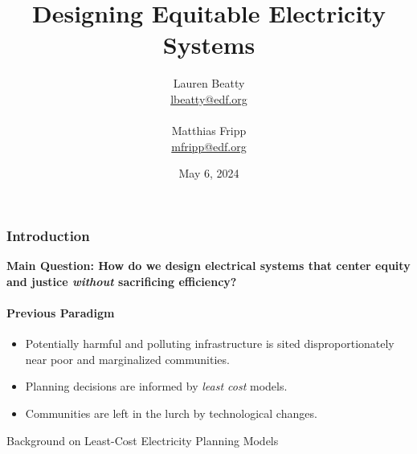 \documentclass{beamer}
\title{Designing Equitable Electricity Systems}
\author{Lauren Beatty\\ \href{mailto:lbeatty@edf.org}{lbeatty@edf.org}\\
\vspace{.5cm}\\
Matthias Fripp\\
\href{mailto:mfripp@edf.org}{mfripp@edf.org}}
\institute{Environmental Defense Fund}
\date{May 6, 2024}
\begin{document}
\frame{\titlepage}

\begin{frame}
\frametitle{Introduction}
\textbf{Main Question:  How do we design electrical systems that center equity and justice \textit{without} sacrificing efficiency?}
\vspace{1cm}

\paragraph{\textbf{Previous Paradigm}}
\begin{itemize}
    \item Potentially harmful and polluting infrastructure is sited disproportionately near poor and marginalized communities.
    \item Planning decisions are informed by \textit{least cost} models.
    \item Communities are left in the lurch by technological changes.
\end{itemize}
\end{frame}

\begin{frame}{Background on Least-Cost Electricity Planning Models}
\begin{center}
\end{center}
\end{frame}
\end{document}
